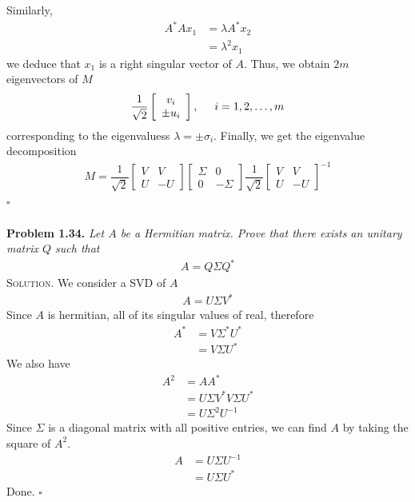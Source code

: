 \documentclass[a4paper,oneside]{book}
\numberwithin{equation}{chapter}
\begin{document}
Similarly,
\begin{align}
{A^*}A{x_1} &= \lambda {A^*}{x_2}\\
 &= {\lambda ^2}{x_1}
\end{align}
we deduce that $x_1$ is a right singular vector of $A$. Thus, we obtain $2m$ eigenvectors of $M$ 
\begin{align}
\dfrac{1}{{\sqrt 2 }}\left[ {\begin{array}{*{20}{c}}
{{v_i}}\\
{ \pm {u_i}}
\end{array}} \right],\hspace{0.5cm} i = 1,2, \ldots ,m
\end{align}
corresponding to the eigenvaluess $\lambda =\pm \sigma _i$. Finally, we get the eigenvalue decomposition
\begin{align}
M = \dfrac{1}{{\sqrt 2 }}\left[ {\begin{array}{*{20}{c}}
V&V\\
U&{ - U}
\end{array}} \right]\left[ {\begin{array}{*{20}{c}}
\Sigma &0\\
0&{ - \Sigma }
\end{array}} \right]\dfrac{1}{{\sqrt 2 }}{\left[ {\begin{array}{*{20}{c}}
V&V\\
U&{ - U}
\end{array}} \right]^{ - 1}}
\end{align}
\hfill $\square$\\
\\
\textbf{Problem 1.34.} \textit{Let $A$ be a Hermitian matrix. Prove that there exists an unitary matrix $Q$ such that}
\begin{align}
A=Q\Sigma Q^*
\end{align}
\textsc{Solution.} We consider a SVD of $A$
\begin{align}
A=U\Sigma V^*
\end{align}
Since $A$ is hermitian, all of its singular values of real, therefore
\begin{align}
{A^*} &= V{\Sigma ^*}{U^*}\\
 &= V\Sigma {U^*}
\end{align}
We also have
\begin{align}
{A^2} &= A{A^*}\\
 &= U\Sigma {V^*}V\Sigma {U^*}\\
 &= U{\Sigma ^2}{U^{ - 1}}
\end{align}
Since $\Sigma$ is a diagonal matrix with all positive entries, we can find $A$ by taking the square of $A^2$.
\begin{align}
A &= U\Sigma {U^{ - 1}}\\
 &= U\Sigma {U^*}
\end{align}
Done. \hfill $\square$\\
\end{document}
